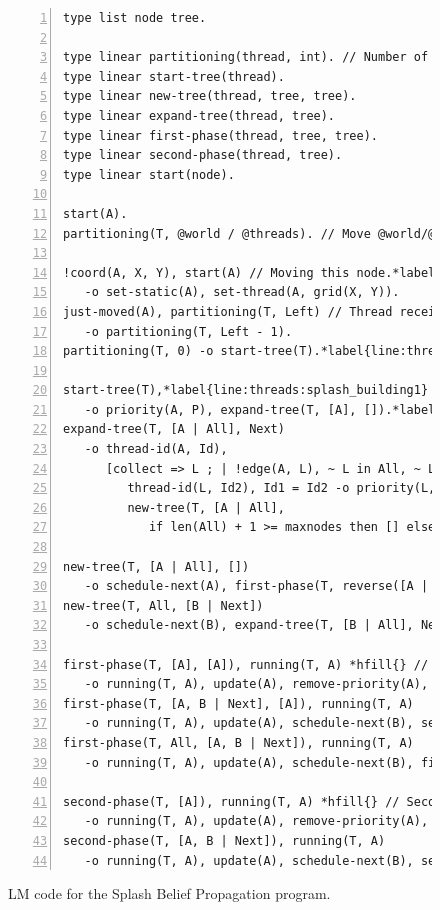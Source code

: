 \begin{figure}[!htb]
\begin{Verbatim}[numbers=left,commandchars=*\{\},fontsize=\codesize]
type list node tree.

type linear partitioning(thread, int). // Number of nodes to receive.
type linear start-tree(thread).
type linear new-tree(thread, tree, tree).
type linear expand-tree(thread, tree).
type linear first-phase(thread, tree, tree).
type linear second-phase(thread, tree).
type linear start(node).

start(A).
partitioning(T, @world / @threads). // Move @world/@threads nodes.

!coord(A, X, Y), start(A) // Moving this node.*label{line:threads:splash_part1}
   -o set-static(A), set-thread(A, grid(X, Y)).
just-moved(A), partitioning(T, Left) // Thread received another node.
   -o partitioning(T, Left - 1).
partitioning(T, 0) -o start-tree(T).*label{line:threads:splash_part2}*label{line:threads:splash_first}

start-tree(T),*label{line:threads:splash_building1} priority(A, P), P > 0.0 *hfill{} // Tree building
   -o priority(A, P), expand-tree(T, [A], []).*label{line:threads:splash_building2}
expand-tree(T, [A | All], Next)
   -o thread-id(A, Id),
      [collect => L ; | !edge(A, L), ~ L in All, ~ L in Next,*label{line:threads:splash_agg1} priority(L, P), P > 0.0,
         thread-id(L, Id2), Id1 = Id2 -o priority(L, P), thread-id(L, Id2) ->
         new-tree(T, [A | All],
            if len(All) + 1 >= maxnodes then [] else Next ++ L end)].*label{line:threads:splash_agg2}*label{line:threads:splash_next}

new-tree(T, [A | All], [])
   -o schedule-next(A), first-phase(T, reverse([A | All]), [A | All]).*label{line:threads:splash_first_phase}
new-tree(T, All, [B | Next])
   -o schedule-next(B), expand-tree(T, [B | All], Next).

first-phase(T, [A], [A]), running(T, A) *hfill{} // First phase
   -o running(T, A), update(A), remove-priority(A), start-tree(T).
first-phase(T, [A, B | Next], [A]), running(T, A)
   -o running(T, A), update(A), schedule-next(B), second-phase(T, [B | Next]).*label{line:threads:splash_first_update1}
first-phase(T, All, [A, B | Next]), running(T, A)
   -o running(T, A), update(A), schedule-next(B), first-phase(T, All, [B | Next]).*label{line:threads:splash_first_update2}

second-phase(T, [A]), running(T, A) *hfill{} // Second phase
   -o running(T, A), update(A), remove-priority(A), start-tree(T).*label{line:threads:splash_second_update1}
second-phase(T, [A, B | Next]), running(T, A)
   -o running(T, A), update(A), schedule-next(B), second-phase(T, [B | Next]).*label{line:threads:splash_second_update2}
\end{Verbatim}

   \caption{LM code for the Splash Belief Propagation program.}
  \label{code:threads:sbp}
\end{figure}

